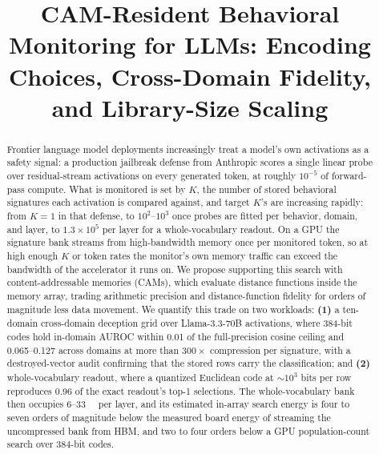 \documentclass[conference]{IEEEtran}
\newcommand{\cam}{{CAM}\xspace}
\newcommand{\auroc}{{AUROC}\xspace}
\begin{document}

\title{\cam-Resident Behavioral Monitoring for LLMs: Encoding Choices,
Cross-Domain Fidelity, and Library-Size Scaling}

\author{
}

\maketitle

\begin{abstract}
Frontier language model deployments increasingly treat a model's own
activations as a safety signal: a production jailbreak defense from
Anthropic scores a single linear probe over residual-stream
activations on every generated token, at roughly $10^{-5}$ of
forward-pass compute. What is monitored is set by $K$, the number
of stored behavioral signatures each activation is compared against,
and target $K$'s are increasing rapidly: from $K=1$ in that defense,
to $10^{2}$--$10^{3}$ once probes are fitted per behavior, domain,
and layer, to $1.3\!\times\!10^{5}$ per layer for a whole-vocabulary
readout. On a GPU the signature bank streams from high-bandwidth
memory once per monitored token, so at high enough $K$ or token rates
the monitor's own memory traffic can exceed the bandwidth of the
accelerator it runs on. We propose supporting this search with
content-addressable memories (\cam{}s), which evaluate distance
functions inside the memory array, trading arithmetic precision and
distance-function fidelity for orders of magnitude less data
movement. We quantify this trade on two workloads: {\bf (1)} a
ten-domain cross-domain deception grid over Llama-3.3-70B
activations, where 384-bit codes hold in-domain \auroc within 0.01
of the full-precision cosine ceiling and 0.065--0.127 across domains
at more than $300\times$ compression per signature, with a
destroyed-vector audit confirming that the stored rows carry the
classification; and {\bf (2)} whole-vocabulary readout,
where a quantized Euclidean code at $\sim$$10^{3}$ bits per row
reproduces 0.96 of the exact readout's top-1 selections. The
whole-vocabulary bank then occupies 6--\qty{33}{\mega\byte} per
layer, and its estimated in-array search energy is four to seven
orders of magnitude below the measured board energy of streaming the
uncompressed bank from HBM, and two to four orders below a GPU
population-count search over 384-bit codes.
\end{abstract}
\end{document}
